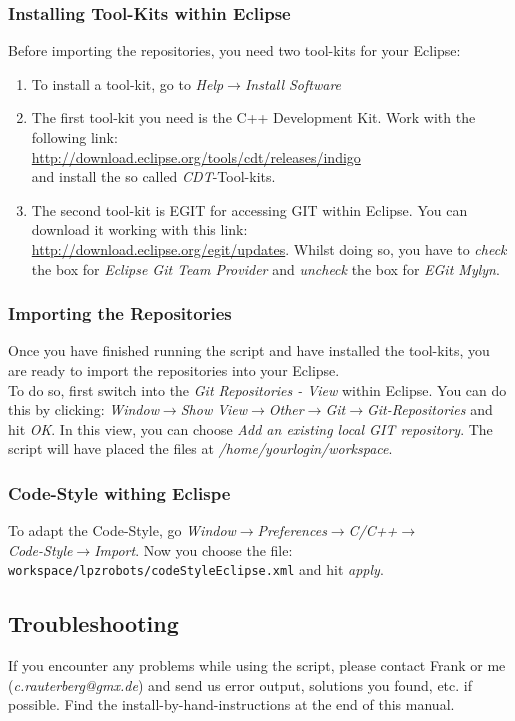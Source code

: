 \subsubsection{Installing Tool-Kits within Eclipse}
Before importing the repositories, you need two tool-kits for your Eclipse:
\begin{enumerate}
 \item To install a tool-kit, go to \emph{Help}$\rightarrow$\emph{Install Software}
 \item The first tool-kit you need is the C++ Development Kit. Work with the following link:\\ \url{http://download.eclipse.org/tools/cdt/releases/indigo} \\ and install the so called \emph{CDT}-Tool-kits.
 \item The second tool-kit is EGIT for accessing GIT within Eclipse. You can download it working with this link:\\ \url{http://download.eclipse.org/egit/updates}. Whilst doing so, you have to \emph{check} the box for \emph{Eclipse Git Team Provider} and \emph{uncheck} the box for \emph{EGit Mylyn}.
\end{enumerate}

\subsubsection{Importing the Repositories}

Once you have finished running the script and have installed the tool-kits, you are ready to import the repositories into your Eclipse. \\
To do so, first switch into the \emph{Git Repositories - View} within Eclipse. You can do this by clicking: \emph{Window}$\rightarrow$\emph{Show View}$\rightarrow$\emph{Other}$\rightarrow$\emph{Git}$\rightarrow$\emph{Git-Repositories} and hit \emph{OK}.
In this view, you can choose \emph{Add an existing local GIT repository}. The script will have placed the files at \emph{/home/yourlogin/workspace}.

\subsubsection{Code-Style withing Eclispe}
To adapt the Code-Style, go \emph{Window}$\rightarrow$\emph{Preferences}$\rightarrow$\emph{C/C++}$\rightarrow$ \\ \emph{Code-Style}$\rightarrow$\emph{Import}. Now you choose the file:\\ \nolinkurl{workspace/lpzrobots/codeStyleEclipse.xml} and hit \emph{apply}.

\subsection{Troubleshooting}

If you encounter any problems while using the script, please contact Frank or me (\emph{c.rauterberg@gmx.de}) and send us error output, solutions you found, etc. if possible. Find the install-by-hand-instructions at the end of this manual. 